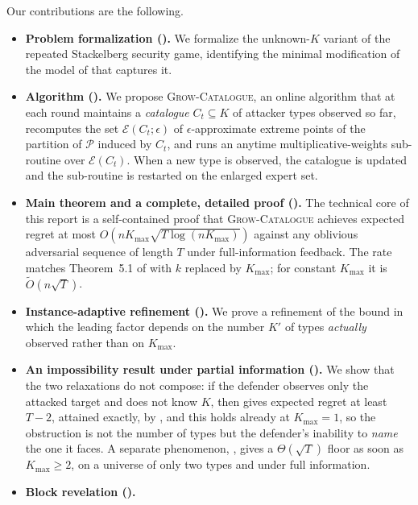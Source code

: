 \documentclass[letterpaper,9pt,twocolumn]{extarticle}
\newcommand{\cP}{\mathcal{P}}
\newcommand{\cE}{\mathcal{E}}
\newcommand{\Kmax}{K_{\max}}
\theoremstyle{plain}
\theoremstyle{definition}
\theoremstyle{remark}
\begin{document}
Our contributions are the following.
\begin{itemize}[leftmargin=1.1em,itemsep=0.10em,topsep=0.2em]
  \item \textbf{Problem formalization ().}
    We formalize the unknown-$K$ variant of the repeated Stackelberg
    security game, identifying the minimal modification of the model of
    \citet{balcan2015} that captures it.
  \item \textbf{Algorithm ().}
    We propose \textsc{Grow-Catalogue}, an online algorithm that at each
    round maintains a \emph{catalogue} $C_t\subseteq K$ of attacker types
    observed so far, recomputes the set $\cE(C_t;\epsilon)$ of
    $\epsilon$-approximate extreme points of the partition of $\cP$
    induced by $C_t$, and runs an anytime multiplicative-weights
    sub-routine over $\cE(C_t)$. When a new type is observed, the
    catalogue is updated and the sub-routine is restarted on the enlarged
    expert set.
  \item \textbf{Main theorem and a complete, detailed proof
    ().}
    The technical core of this report is a self-contained proof that
    \textsc{Grow-Catalogue} achieves expected regret at most
    $O(n\Kmax\sqrt{T\log (n\Kmax)})$ against any oblivious
    adversarial sequence of length $T$ under full-information feedback.
    The rate matches Theorem~5.1 of \citet{balcan2015} with $k$ replaced
    by $\Kmax$; for constant $\Kmax$ it is $\tilde O(n\sqrt T)$.
  \item \textbf{Instance-adaptive refinement ().}
    We prove a refinement of the bound in which the leading factor depends
    on the number $K'$ of types \emph{actually} observed rather than on
    $\Kmax$.
  \item \textbf{An impossibility result under partial information
    ().}
    We show that the two relaxations do not compose: if the defender
    observes only the attacked target and does not know $K$, then
     gives expected regret at least $T-2$, attained
    exactly, by , and this holds already at
    $\Kmax=1$, so the obstruction is not the number of types but the
    defender's inability to \emph{name} the one it faces. A separate
    phenomenon, , gives a $\Theta(\sqrt T)$ floor as soon
    as $\Kmax\ge 2$, on a universe of only two types and under full
    information.
  \item \textbf{Block revelation ().}

\end{itemize}
\end{document}
